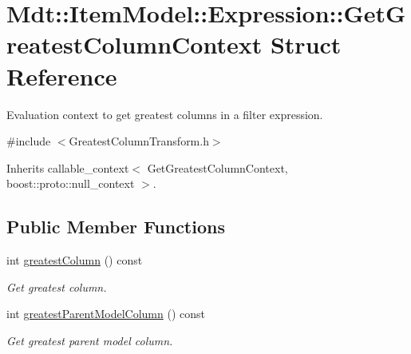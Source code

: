 \hypertarget{struct_mdt_1_1_item_model_1_1_expression_1_1_get_greatest_column_context}{}\section{Mdt\+:\+:Item\+Model\+:\+:Expression\+:\+:Get\+Greatest\+Column\+Context Struct Reference}
\label{struct_mdt_1_1_item_model_1_1_expression_1_1_get_greatest_column_context}


Evaluation context to get greatest columns in a filter expression.  




{\ttfamily \#include $<$Greatest\+Column\+Transform.\+h$>$}



Inherits callable\+\_\+context$<$ Get\+Greatest\+Column\+Context, boost\+::proto\+::null\+\_\+context $>$.

\subsection*{Public Member Functions}
\begin{DoxyCompactItemize}
\item 
int \hyperlink{struct_mdt_1_1_item_model_1_1_expression_1_1_get_greatest_column_context_a0336e7a748bd35e7d9bb2694adb45729}{greatest\+Column} () const \hypertarget{struct_mdt_1_1_item_model_1_1_expression_1_1_get_greatest_column_context_a0336e7a748bd35e7d9bb2694adb45729}{}\label{struct_mdt_1_1_item_model_1_1_expression_1_1_get_greatest_column_context_a0336e7a748bd35e7d9bb2694adb45729}

\begin{DoxyCompactList}\small\item\em Get greatest column. \end{DoxyCompactList}\item 
int \hyperlink{struct_mdt_1_1_item_model_1_1_expression_1_1_get_greatest_column_context_ad0f682edf2c9a55d705ab4d90fc9fba2}{greatest\+Parent\+Model\+Column} () const \hypertarget{struct_mdt_1_1_item_model_1_1_expression_1_1_get_greatest_column_context_ad0f682edf2c9a55d705ab4d90fc9fba2}{}\label{struct_mdt_1_1_item_model_1_1_expression_1_1_get_greatest_column_context_ad0f682edf2c9a55d705ab4d90fc9fba2}

\begin{DoxyCompactList}\small\item\em Get greatest parent model column. \end{DoxyCompactList}\end{DoxyCompactItemize}


